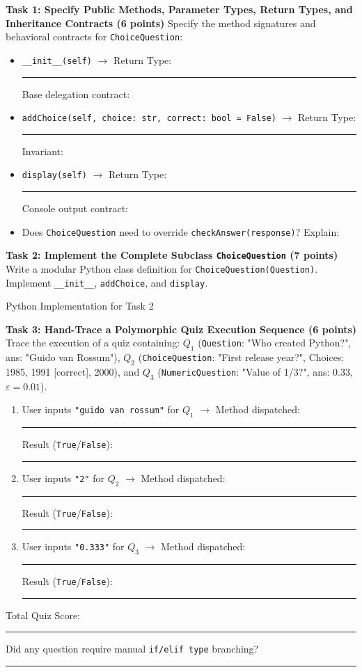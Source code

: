 \documentclass[11pt,a4paper]{article}
\begin{document}
\vspace{0.5mm}
\textbf{Task 1: Specify Public Methods, Parameter Types, Return Types, and Inheritance Contracts (6 points)}
Specify the method signatures and behavioral contracts for \texttt{ChoiceQuestion}:
\begin{itemize}[leftmargin=1.8em,itemsep=1.5pt]
\item \texttt{\_\_init\_\_(self)} $\rightarrow$ Return Type: \rule{2.5cm}{0.4pt} \quad Base delegation contract: \dotfill
\item \texttt{addChoice(self, choice: str, correct: bool = False)} $\rightarrow$ Return Type: \rule{2.0cm}{0.4pt} \quad Invariant: \dotfill
\item \texttt{display(self)} $\rightarrow$ Return Type: \rule{2.5cm}{0.4pt} \quad Console output contract: \dotfill
\item Does \texttt{ChoiceQuestion} need to override \texttt{checkAnswer(response)}? Explain: \dotfill
\end{itemize}

\textbf{Task 2: Implement the Complete Subclass \texttt{ChoiceQuestion} (7 points)}
Write a modular Python class definition for \texttt{ChoiceQuestion(Question)}. Implement \texttt{\_\_init\_\_}, \texttt{addChoice}, and \texttt{display}.
\begin{answerbox}[height=3.8cm]{Python Implementation for Task 2}\end{answerbox}

\textbf{Task 3: Hand-Trace a Polymorphic Quiz Execution Sequence (6 points)}
Trace the execution of a quiz containing: $Q_1$ (\texttt{Question}: "Who created Python?", ans: "Guido van Rossum"), $Q_2$ (\texttt{ChoiceQuestion}: "First release year?", Choices: 1985, 1991 [correct], 2000), and $Q_3$ (\texttt{NumericQuestion}: "Value of 1/3?", ans: 0.33, $\varepsilon=0.01$).
\begin{enumerate}[label=\arabic*.,leftmargin=1.8em,itemsep=1pt]
\item User inputs \texttt{"guido van rossum"} for $Q_1$ $\rightarrow$ Method dispatched: \rule{3.0cm}{0.4pt} \quad Result (\texttt{True}/\texttt{False}): \rule{1.5cm}{0.4pt}
\item User inputs \texttt{"2"} for $Q_2$ $\rightarrow$ Method dispatched: \rule{3.0cm}{0.4pt} \quad Result (\texttt{True}/\texttt{False}): \rule{1.5cm}{0.4pt}
\item User inputs \texttt{"0.333"} for $Q_3$ $\rightarrow$ Method dispatched: \rule{3.0cm}{0.4pt} \quad Result (\texttt{True}/\texttt{False}): \rule{1.5cm}{0.4pt}
\end{enumerate}
Total Quiz Score: \rule{2.5cm}{0.4pt} \quad Did any question require manual \texttt{if/elif type} branching? \rule{2.0cm}{0.4pt}
\end{document}

